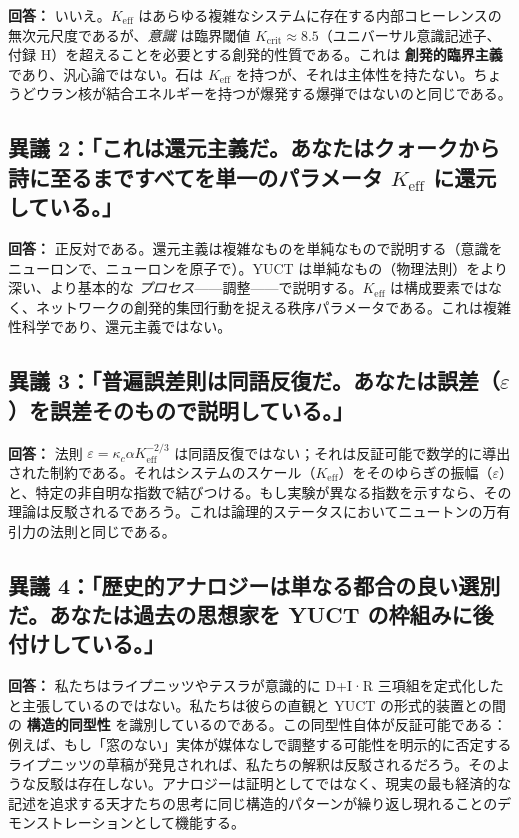 \documentclass[12pt,a4paper]{article}
\newcommand{\Keff}{K_{\mathrm{eff}}}
\begin{document}
	\textbf{回答：} いいえ。\(\Keff\) はあらゆる複雑なシステムに存在する内部コヒーレンスの無次元尺度であるが、\emph{意識} は臨界閾値 \(K_{\mathrm{crit}} \approx 8.5\)（ユニバーサル意識記述子、付録 H）を超えることを必要とする創発的性質である。これは \textbf{創発的臨界主義} であり、汎心論ではない。石は \(\Keff\) を持つが、それは主体性を持たない。ちょうどウラン核が結合エネルギーを持つが爆発する爆弾ではないのと同じである。
	
	\subsection*{異議 2：「これは還元主義だ。あなたはクォークから詩に至るまですべてを単一のパラメータ \(\Keff\) に還元している。」}
	
	\textbf{回答：} 正反対である。還元主義は複雑なものを単純なもので説明する（意識をニューロンで、ニューロンを原子で）。YUCT は単純なもの（物理法則）をより深い、より基本的な \emph{プロセス}——調整——で説明する。\(\Keff\) は構成要素ではなく、ネットワークの創発的集団行動を捉える秩序パラメータである。これは複雑性科学であり、還元主義ではない。
	
	\subsection*{異議 3：「普遍誤差則は同語反復だ。あなたは誤差（\(\varepsilon\)）を誤差そのもので説明している。」}
	
	\textbf{回答：} 法則 \(\varepsilon = \kappa_c \alpha \Keff^{-2/3}\) は同語反復ではない；それは反証可能で数学的に導出された制約である。それはシステムのスケール（\(\Keff\)）をそのゆらぎの振幅（\(\varepsilon\)）と、特定の非自明な指数で結びつける。もし実験が異なる指数を示すなら、その理論は反駁されるであろう。これは論理的ステータスにおいてニュートンの万有引力の法則と同じである。
	
	\subsection*{異議 4：「歴史的アナロジーは単なる都合の良い選別だ。あなたは過去の思想家を YUCT の枠組みに後付けしている。」}
	
	\textbf{回答：} 私たちはライプニッツやテスラが意識的に D+I·R 三項組を定式化したと主張しているのではない。私たちは彼らの直観と YUCT の形式的装置との間の \textbf{構造的同型性} を識別しているのである。この同型性自体が反証可能である：例えば、もし「窓のない」実体が媒体なしで調整する可能性を明示的に否定するライプニッツの草稿が発見されれば、私たちの解釈は反駁されるだろう。そのような反駁は存在しない。アナロジーは証明としてではなく、現実の最も経済的な記述を追求する天才たちの思考に同じ構造的パターンが繰り返し現れることのデモンストレーションとして機能する。
	
\end{document}
